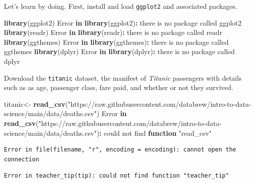 \documentclass[
]{book}
\newenvironment{Shaded}{\begin{snugshade}}{\end{snugshade}}
\newcommand{\ControlFlowTok}[1]{\textcolor[rgb]{0.13,0.29,0.53}{\textbf{#1}}}
\newcommand{\FunctionTok}[1]{\textcolor[rgb]{0.13,0.29,0.53}{\textbf{#1}}}
\newcommand{\NormalTok}[1]{#1}
\newcommand{\OtherTok}[1]{\textcolor[rgb]{0.56,0.35,0.01}{#1}}
\newcommand{\SpecialCharTok}[1]{\textcolor[rgb]{0.81,0.36,0.00}{\textbf{#1}}}
\newcommand{\StringTok}[1]{\textcolor[rgb]{0.31,0.60,0.02}{#1}}
\begin{document}
Let's learn by doing. First, install and load \texttt{ggplot2} and associated packages.

\begin{Shaded}
\begin{Highlighting}[]
\FunctionTok{library}\NormalTok{(ggplot2)}
\NormalTok{Error }\ControlFlowTok{in} \FunctionTok{library}\NormalTok{(ggplot2)}\SpecialCharTok{:}\NormalTok{ there is no package called }\StringTok{\textquotesingle{}ggplot2\textquotesingle{}}
\FunctionTok{library}\NormalTok{(readr)}
\NormalTok{Error }\ControlFlowTok{in} \FunctionTok{library}\NormalTok{(readr)}\SpecialCharTok{:}\NormalTok{ there is no package called }\StringTok{\textquotesingle{}readr\textquotesingle{}}
\FunctionTok{library}\NormalTok{(ggthemes)}
\NormalTok{Error }\ControlFlowTok{in} \FunctionTok{library}\NormalTok{(ggthemes)}\SpecialCharTok{:}\NormalTok{ there is no package called }\StringTok{\textquotesingle{}ggthemes\textquotesingle{}}
\FunctionTok{library}\NormalTok{(dplyr)}
\NormalTok{Error }\ControlFlowTok{in} \FunctionTok{library}\NormalTok{(dplyr)}\SpecialCharTok{:}\NormalTok{ there is no package called }\StringTok{\textquotesingle{}dplyr\textquotesingle{}}
\end{Highlighting}
\end{Shaded}

Download the \texttt{titanic} dataset, the manifest of \emph{Titanic} passengers with details such as as age, passenger class, fare paid, and whether or not they survived.

\begin{Shaded}
\begin{Highlighting}[]
\NormalTok{titanic}\OtherTok{\textless{}{-}} \FunctionTok{read\_csv}\NormalTok{(}\StringTok{"https://raw.githubusercontent.com/databrew/intro{-}to{-}data{-}science/main/data/deaths.csv"}\NormalTok{)}
\NormalTok{Error }\ControlFlowTok{in} \FunctionTok{read\_csv}\NormalTok{(}\StringTok{"https://raw.githubusercontent.com/databrew/intro{-}to{-}data{-}science/main/data/deaths.csv"}\NormalTok{)}\SpecialCharTok{:}\NormalTok{ could not find }\ControlFlowTok{function} \StringTok{"read\_csv"}
\end{Highlighting}
\end{Shaded}

\begin{verbatim}
Error in file(filename, "r", encoding = encoding): cannot open the connection
\end{verbatim}

\begin{verbatim}
Error in teacher_tip(tip): could not find function "teacher_tip"
\end{verbatim}
\end{document}
